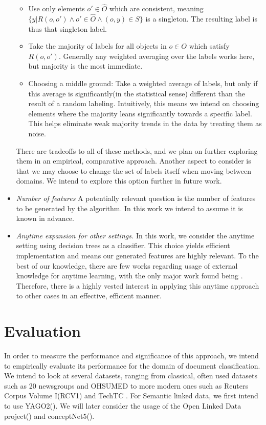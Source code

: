 \documentclass[12pt, a4paper]{article}
\theoremstyle{definition}
\begin{document}
\begin{itemize}
\begin{itemize}
            \item Use only elements $o'\in \hat{O}$ which are consistent, meaning $\{y|R(o,o')\wedge o'\in \hat{O}\wedge (o,y)\in S\}$ is a singleton. The resulting label is thus that singleton label.
            \item Take the majority of labels for all objects in $o\in O$ which satisfy $R(o,o')$. Generally any weighted averaging over the labels works here, but majority is the most immediate.
            \item Choosing a middle ground: Take a weighted average of labels, but only if this average is significantly(in the statistical sense) different than the result of a random labeling. Intuitively, this means we intend on choosing elements where the majority leans significantly towards a specific label. This helps eliminate weak majority trends in the data by treating them as noise.
        \end{itemize}
        There are tradeoffs to all of these methods, and we plan on further exploring them in an empirical, comparative approach.
        Another aspect to consider is that we may choose to change the set of labels itself when moving between domains. We intend to explore this option further in future work.
    \item \emph{Number of features} A potentially relevant question is the number of features to be generated by the algorithm. In this work we intend to assume it is known in advance.
    \item \emph{Anytime expansion for other settings.} In this work, we consider the anytime setting using decision trees as a classifier. This choice yields efficient implementation and means our generated features are highly relevant. To the best of our knowledge, there are few works regarding usage of external knowledge for anytime learning, with the only major work found being \citet{lindgren2000anytime}. Therefore, there is a highly vested interest in applying this anytime approach to other cases in an effective, efficient manner.
\end{itemize}

\section{Evaluation}
In order to measure the performance and significance of this approach, we intend to empirically evaluate its performance for the domain of document classification. We intend to look at several datasets, ranging from classical, often used datasets such as 20 newsgroups \citep{Lang95} and OHSUMED \citep{hersh1994ohsumed} to more modern ones such as Reuters Corpus Volume I(RCV1)\citep{lewis2004rcv1} and TechTC \citep{davidov2004parameterized}. For Semantic linked data, we first intend to use YAGO2(\citet{hoffart2013yago2}). We will later consider the usage of the Open Linked Data project(\citet{bizer2009linked}) and conceptNet5(\citet{speer2012representing}).\\
\end{document}
